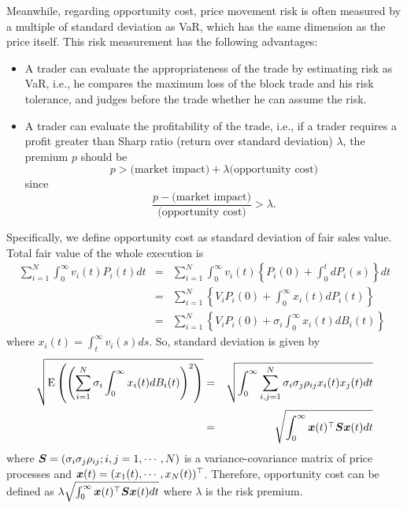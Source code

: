 Meanwhile, regarding opportunity cost, price movement risk is often measured by a multiple of standard deviation as VaR, which has the same dimension as the price itself.  This risk measurement has the following advantages:
\begin{itemize}
 \item A trader can evaluate the appropriateness of the trade by estimating risk as VaR, i.e., he compares the maximum loss of the block trade and his risk tolerance, and judges before the trade whether he can assume the risk.
 \item A trader can evaluate the profitability of the trade, i.e., if a trader requires a profit greater than Sharp ratio (return over standard deviation) $\lambda$, the premium $p$ should be
\[
  p > \mbox{(market impact)} + \lambda \mbox{(opportunity cost)}
\]
since
\[
  \frac{p - \mbox{(market impact)}}{\mbox{(opportunity cost)}} > \lambda.
\]
\end{itemize}

Specifically, we define opportunity cost as standard deviation of fair sales value.  Total fair value of the whole execution is
\begin{eqnarray*}
  \sum_{i=1}^N \int_0^\infty v_i(t) P_i(t) dt
     & = & \sum_{i=1}^N \int_0^\infty v_i(t) \left\{ P_i(0) + \int_0^t dP_i(s) \right\} dt \\
     & = & \sum_{i=1}^N \left\{ V_iP_i(0) + \int_0^\infty x_i(t) dP_i(t) \right\} \\
     & = & \sum_{i=1}^N \left\{ V_iP_i(0) + \sigma_i \int_0^\infty x_i(t) dB_i(t) \right\}
\end{eqnarray*}
where $x_i(t)=\int_t^\infty v_i(s) ds$.
 So, standard deviation is given by
\begin{eqnarray}
  \sqrt{\ex{\left( \sum_{i=1}^N \sigma_i \int_0^\infty x_i(t) dB_i(t) \right)^2}}
   & = & \sqrt{ \int_0^\infty \sum_{i,j=1}^N \sigma_i \sigma_j \rho_{ij} x_i(t) x_j(t) dt } \nonumber \\
   & = & \sqrt{ \int_0^\infty \x(t)^\top \S \x(t) dt } \label{eq_b17}
\end{eqnarray}
where $\S = ( \sigma_i \sigma_j \rho_{ij}; i,j=1,\cdots,N)$ is a variance-covariance matrix of price processes and $\x(t)=(x_1(t),\cdots,x_N(t))^\top$.
 Therefore, opportunity cost can be defined as $\lambda \sqrt{ \int_0^\infty \x(t)^\top \S \x(t) dt }$ where $\lambda$ is the risk premium.

